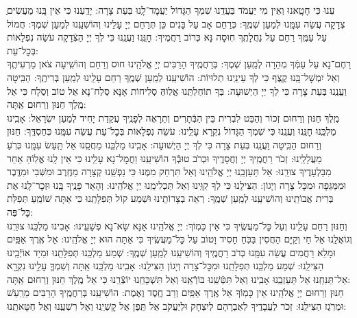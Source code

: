 \documentclass[twoside, openany, parskip=half, 11pt]{book}
\begin{document}
ַֽעְנוּ כִּי חָטָֽאנוּ וְאֵין מִי יַעֲמֹד בַּעֲדֵֽנוּ שִׁמְךָ הַגָּדוֹל יַעֲמׇד־לָֽנוּ בְּעֵת צָרָה: יָדַֽעְנוּ כִּי אֵין בָּֽנוּ מַעֲשִׂים צְדָקָה עֲשֵׂה עִמָּֽנוּ לְמַעַן שְׁמֶֽךָ: כְּרַחֵם אָב עַל בָּנִים כֵּן תְּרַחֵם יְיָ עָלֵינוּ וְהוֹשִׁעֵֽנוּ לְמַעַן שְׁמֶךָ: חֲמוֹל עַל עַמֶּֽךָ רַחֵם עַל נַחֲלָתֶֽךָ חֽוּסָה נָּא כְּרוֹב רַחֲמֶיךָ: חׇנֵּֽנוּ וַעֲנֵֽנוּ כִּי לְךָ יְיָ הַצְּֿדָקָה עֹשֵׂה נִפְלָאוֹת בְּכׇל־עֵת:\\
רַחֶם־נָא עַל עַמְּֿךָ מְהֵרָה לְמַֽעַן שְׁמֶךָ: בְּרַחֲמֶֽיךָ הָרַבִּים יְיָ אֱלֹהֵֽינוּ חוּס וְרַחֵם וְהוֹשִֽׁיעָה צֹאן מַרְעִיתֶֽךָ וְאַל יִמְשׇׁל־בָּֽנוּ קֶֽצֶף כִּי לְךָ עֵינֵֽינוּ תְלוּיוֹת: הוֹשִׁיעֵֽנוּ לְמַֽעַן שְׁמֶֽךָ רַחֵם עָלֵֽינוּ לְמַֽעַן בְּרִיתֶֽךָ: הַבִּֽיטָה וַעֲנֵֽנוּ בְּעֵת צָרָה כִּי לְךָ יְיָ הַיְשׁוּעָה: בְּךָ תוֹחַלְתֵּֽנוּ אֱלֽוֹהַּ סְלִיחוֹת אָנָּא סְלַח־נָא אֵל טוֹב וְסַלָח כִּי אֵל מֶֽלֶךְ חַנּוּן וְרַחוּם אַֽתָּה:\\
מֶֽלֶךְ חַנּוּן וְרַחוּם זְכוֹר וְהַבֵּט לִבְרִית בֵּין הַבְּֿתָרִים וְתֵרָאֶה לְפָנֶֽיךָ עֲקֵדַת יָחִיד לְמַעַן יִשְׂרָאֵל: אָבִֽינוּ מַלְכֵּֽנוּ חׇנֵּֽנוּ וְעֲנֵֽנוּ כִּי שִׁמְךָ הַגָּדוֹל נִקְרָא עָלֵֽינוּ: עֹשֵׂה נִפְלָאוֹת בְּכׇל־עֵת עֲשֵׂה עִמָּֽנוּ כְּחַסְדֶּֽךָ: חַנּוּן וְרַחוּם הַבִּֽיטָה וַעֲנֵֽנוּ בְּעֵת צָרָה כִּי לְךָ יְיָ הַיְשׁוּעָה: אָבִֽינוּ מַלְכֵּֽנוּ מַחֲסֵֽנוּ אַל תַּֽעַשׂ עִמָּֽנוּ כְּרֹֽעַ מַעֲלָלֵֽינוּ: זְכֹר רַחֲמֶֽיךָ יְיָ וְחֲסָדֶֽיךָ וּכְרֹב טוּבְֿךָ הוֹשִׁיעֵֽנוּ וַחֲמׇל־נָא עָלֵֽינוּ כִּי אֵין לָֽנוּ אֱלֽוֹהַּ אַחֵר מִבַּלְעָדֶיךָ צוּרֵֽנוּ: אַל תַּעַזְבֵֽנוּ יְיָ אֱלֹהֵֽינוּ וְאַל תִּרְחַק מִמֶּנּוּ כִּי נַפְשֵֽׁנוּ קְצָרָה מֵחֶֽרֶב וּמִשְּׁבִי וּמִדֶּֽבֶר וּמִמַּגֵּפָה וּמִכָּל צָרָה וְיָגוֹן: הַצִּילֵֽנוּ כִּי לְךָ קִוִּֽינוּ וְאַל תַּכְלִימֵֽנוּ יְיָ אֱלֹהֵֽינוּ: וְהָאֵר פָּנֶֽיךָ בָּֽנוּ וּזְכׇר־לָֽנוּ אֶת בְּרִית אֲבוֹתֵֽינוּ וְהוֹשִׁיעֵֽנוּ לְמַֽעַן שְׁמֶֽךָ: רְאֵה בְצָרוֹתֵֽינוּ וּשְׁמַע קוֹל תְּפִלָּתֵֽנוּ כִּי אַתָּה שׁוֹמֵֽעַ תְּפִלַּת כׇּל־פֶּה:\\
וְחַנּוּן רַחֵם עָלֵֽינוּ וְעַל כׇּל־מַעֲשֶֽׂיךָ כִּי אֵין כָּמֽוֹךָ: יְיָ אֱלֹהֵֽינוּ אָנָּא שָׂא־נָא פְשָׁעֵֽינוּ: אָבִינוּ מַלְכֵּֽנוּ צוּרֵֽנוּ וְגוֹאֲלֵֽנוּ אֵל חַי וְקַיָּם הַחֲסִין בַּכֹּֽחַ חָסִיד וָטוֹב עַל כׇּל־מַעֲשֶֽׂיךָ כִּי אַתָּה הוּא יְיָ אֱלֹהֵֽינוּ: אֵל אֶֽרֶךְ אַפַּֽיִם וּמָלֵא רַחֲמִים עֲשֵׂה עִמָּֽנוּ כְּרֹב רַחֲמֶֽיךָ וְהוֹשִׁיעֵֽנוּ לְמַֽעַן שְׁמֶֽךָ: שְׁמַע מַלְכֵּֽנוּ תְּפִלָּתֵֽנוּ וּמִיַד אוֹיְֿבֵֽינוּ הַצִּילֵֽנוּ: שְׁמַע מַלְכֵּֽנוּ תְּפִלָּתֵֽנוּ וּמִכׇּל־צָרָה וְיָגוֹן הַצִּילֵֽנוּ: אָבִֽינוּ מַלְכֵּֽנוּ אַֽתָּה 
וְשִׁמְךָ֛ עָלֵ֥ינוּ נִקְרָ֖א אַל־תַּנִּחֵֽנוּ׃ 
אַל תַּעַזְבֵֽנוּ אָבִֽינוּ וְאַל תִּטְּֿשֵֽׁנוּ בּוֹרְֿאֵֽנוּ וְאַל תִּשְׁכָּחֵֽנוּ יוֹצְֿרֵֽנוּ כִּי אֵל מֶֽלֶךְ חַנּוּן וְרַחוּם אַֽתָּה:\\
חַנּוּן וְרַחוּם יְיָ אֱלֹהֵֽינוּ אֵין כָּמֽוֹךָ אֵל אֶֽרֶךְ אַפַּֽיִם וְרַב חֶֽסֶד וֶאֶמֶת: הוֹשִׁיעֵֽנוּ בְּרַחֲמֶֽיךָ הָרַבִּים מֵרַֽעַשׁ וּמֵרֹֽגֶז הַצִּילֵֽנוּ: זְכֹר לַעֲבָדֶֽיךָ לְאַבְרָהָם לְיִצְחָק וּלְיַעֲקֹב אַל תֵּֽפֶן אֶל קׇשְׁיֵֽנוּ וְאֶל רִשְׁעֵֽנוּ וְאֶל חַטָּאתֵֽנוּ: 
\end{document}
